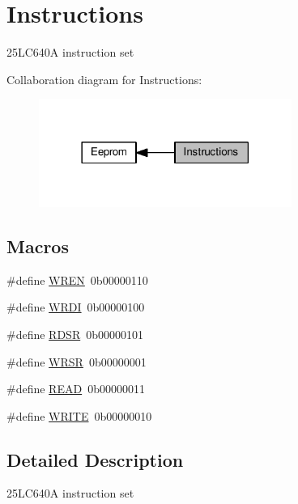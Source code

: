 \hypertarget{group___instructions}{}\section{Instructions}
\label{group___instructions}


25\+L\+C640A instruction set  


Collaboration diagram for Instructions\+:\nopagebreak
\begin{figure}[H]
\begin{center}
\leavevmode
\includegraphics[width=234pt]{df/d4d/group___instructions}
\end{center}
\end{figure}
\subsection*{Macros}
\begin{DoxyCompactItemize}
\item 
\#define \hyperlink{group___instructions_ga53dec1d28a7c7b24b2d56c058f7e140a}{W\+R\+EN}~0b00000110
\item 
\#define \hyperlink{group___instructions_gacb229428140f30a6f8b6fa2ebb3fb6f0}{W\+R\+DI}~0b00000100
\item 
\#define \hyperlink{group___instructions_ga899f71cf1ab9be6e8c8482e443558450}{R\+D\+SR}~0b00000101
\item 
\#define \hyperlink{group___instructions_ga29d01dca16eb0a060d2efd567b58b47a}{W\+R\+SR}~0b00000001
\item 
\#define \hyperlink{group___instructions_gada74e7db007a68e763f20c17f2985356}{R\+E\+AD}~0b00000011
\item 
\#define \hyperlink{group___instructions_gaa10f470e996d0f51210d24f442d25e1e}{W\+R\+I\+TE}~0b00000010
\end{DoxyCompactItemize}


\subsection{Detailed Description}
25\+L\+C640A instruction set 



